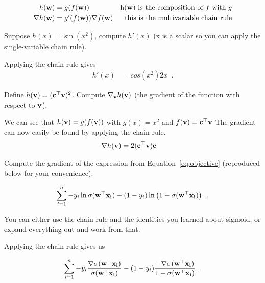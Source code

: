 \documentclass[assignment03_Solutions]{subfiles}
\begin{document}
\begin{align}
h(\mathbf{w}) &= g(f(\mathbf{w}))&\mbox{h($\mathbf{w}$) is the composition of $f$ with $g$} \nonumber \\
\nabla h(\mathbf{w}) &= g'(f(\mathbf{w})) \nabla f(\mathbf{w}) & \mbox{this is the multivariable chain rule}
\end{align}

\begin{exercise}[(60 minutes)]
\bes
\item Suppose $h(x) = \sin(x^2)$, compute $h'(x)$ (x is a scalar so you can apply the single-variable chain rule).

\begin{boxedsolution}

Applying the chain rule gives
\begin{align}
h'(x) &= cos(x^2) 2x \enspace .
\end{align}
\end{boxedsolution}

\item Define $h(\mathbf{v}) = (\mathbf{c}^\top \mathbf{v})^2$.  Compute $\nabla_{\mathbf{v}} h(\mathbf{v})$ (the gradient of the function with respect to $\mathbf{v}$).

\begin{boxedsolution}
We can see that $h(\mathbf{v}) = g(f(\mathbf{v}))$ with $g(x) = x^2$ and $f(\mathbf{v}) = \mathbf{c}^\top \mathbf{v}$ The gradient can now easily be found by applying the chain rule.
\begin{align}
\nabla h(\mathbf{v}) &= 2(\mathbf{c}^\top \mathbf{v}) \mathbf{c}
\end{align}
\end{boxedsolution}

\item Compute the gradient of the expression from Equation~\ref{eq:objective} (reproduced below for your convenience).

\begin{align}
 \sum_{i=1}^n -y_i \ln \sigma( \mathbf{w}^\top \mathbf{x_i}) - (1-y_i) \ln  \left (1 - \sigma( \mathbf{w}^\top \mathbf{x_i}) \right ) \enspace .
\end{align}

You can either use the chain rule and the identities you learned about sigmoid, or expand everything out and work from that.

\begin{boxedsolution}
Applying the chain rule gives us

\begin{align}
 \sum_{i=1}^n -y_i \frac{\nabla \sigma( \mathbf{w}^\top \mathbf{x_i})}{\sigma( \mathbf{w}^\top \mathbf{x_i})} - (1-y_i) \frac{- \nabla \sigma( \mathbf{w}^\top \mathbf{x_i})}{1 - \sigma( \mathbf{w}^\top \mathbf{x_i})}  \enspace .
\end{align}


\end{boxedsolution}
\end{exercise}
\end{document}
